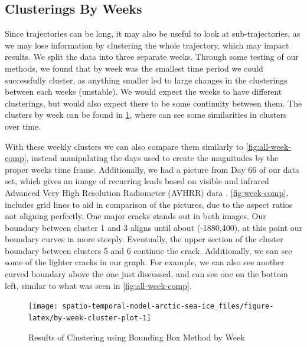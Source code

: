 \documentclass[12pt]{article}
\begin{document}
\hypertarget{clusterings-by-weeks}{%
\subsection{Clusterings By Weeks}\label{clusterings-by-weeks}}

Since trajectories can be long, it may also be useful to look at
sub-trajectories, as we may lose information by clustering the whole
trajectory, which may impact results. We split the data into three
separate weeks. Through some testing of our methods, we found that by
week was the smallest time period we could successfully cluster, as
anything smaller led to large changes in the clusterings between each
weeks (unstable). We would expect the weeks to have different
clusterings, but would also expect there to be some continuity between
them. The clusters by week can be found in
\cref{fig:by-week-cluster-plot}, where can see some similarities in
clusters over time.

With these weekly clusters we can also compare them similarly to
\cref{fig:all-week-comp}, instead manipulating the days used to create
the magnitudes by the proper weeks time frame. Additionally, we had a
picture from Day 66 of our data set, which gives an image of recurring
leads based on visible and infrared Advanced Very High Resolution
Radiometer (AVHRR) data \citep{lead_pic_2009}. \cref{fig:week-comp},
includes grid lines to aid in comparison of the pictures, due to the
aspect ratios not aligning perfectly. One major cracks stands out in
both images. Our boundary between cluster 1 and 3 aligns until about
(-1880,400), at this point our boundary curves in more steeply.
Eventually, the upper section of the cluster boundary between clusters 5
and 6 continue the crack. Additionally, we can see some of the lighter
cracks in our graph. For example, we can also see another curved
boundary above the one just discussed, and can see one on the bottom
left, similar to what was seen in \cref{fig:all-week-comp}.

\begin{figure}[tbp]

{\centering \texttt{[image: spatio-temporal-model-arctic-sea-ice\_files/figure-latex/by-week-cluster-plot-1]} 

}

\caption{Results of Clustering using Bounding Box Method by Week}\label{fig:by-week-cluster-plot}
\end{figure}
\end{document}
